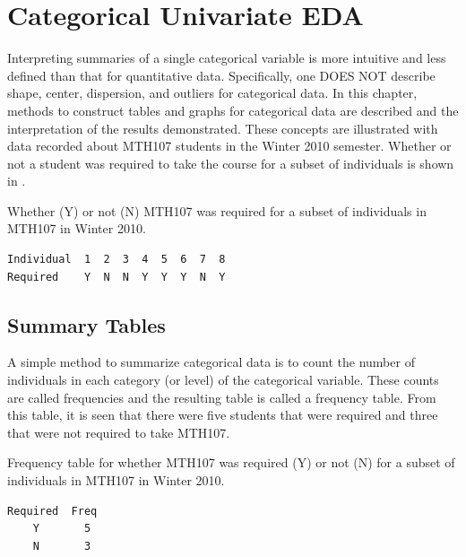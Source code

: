 \documentclass[10pt,openany]{book}\usepackage[]{graphicx}\usepackage[]{color}
\begin{document}
\clearpage
\section{Categorical Univariate EDA}  \label{sect:UEDACategorical}
Interpreting summaries of a single categorical variable is more intuitive and less defined than that for quantitative data.  Specifically, one DOES NOT describe shape, center, dispersion, and outliers for categorical data.  In this chapter, methods to construct tables and graphs for categorical data are described and the interpretation of the results demonstrated.  These concepts are illustrated with data recorded about MTH107 students in the Winter 2010 semester.  Whether or not a student was required to take the course for a subset of individuals is shown in .

\begin{table}[htbp]
  \caption{Whether (Y) or not (N) MTH107 was required for a subset of individuals in MTH107 in Winter 2010.}
  \label{tab:MTH107Subset}
  \centering
  \begin{Verbatim}[xleftmargin=5mm]
Individual  1  2  3  4  5  6  7  8
Required    Y  N  N  Y  Y  Y  N  Y
  \end{Verbatim}
\end{table}


\subsection{Summary Tables}
A simple method to summarize categorical data is to count the number of individuals in each category (or level) of the categorical variable.  These counts are called frequencies and the resulting table  is called a frequency table.  From this table, it is seen that there were five students that were required and three that were not required to take MTH107.

\begin{table}[htbp]
  \caption{Frequency table for whether MTH107 was required (Y) or not (N) for a subset of individuals in MTH107 in Winter 2010.}
  \label{tab:MTH107SubsetFreq}
  \centering
  \begin{Verbatim}[xleftmargin=5mm]
Required  Freq
    Y       5
    N       3
  \end{Verbatim}
\end{table}

\end{document}
